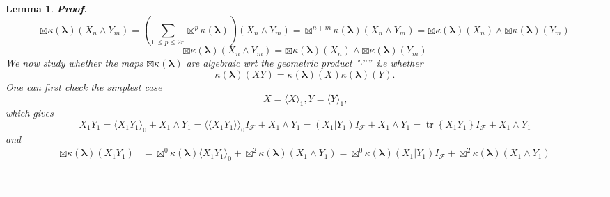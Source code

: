 \documentclass[aps, preprint]{revtex4}
\newtheorem{lemma}[theorem]{Lemma}
\newenvironment{proof}[1][Proof]{\noindent\textbf{#1.} }{\ \rule{0.5em}{0.5em}}
\begin{document}
\begin{lemma}
\begin{proof}
\begin{equation} \boxtimes \kappa  \left (\mathbf{\lambda }\right ) \left (X_{n} \wedge Y_{m}\right ) =\left (\sum _{0 \leq p \leq 2 r} \boxtimes ^{p}\kappa  \left (\mathbf{\lambda }\right )\right ) \left (X_{n} \wedge Y_{m}\right ) = \boxtimes ^{n +m}\kappa  \left (\mathbf{\lambda }\right ) \left (X_{n} \wedge Y_{m}\right ) = \boxtimes \kappa  \left (\mathbf{\lambda }\right ) \left (X_{n}\right )  \wedge  \boxtimes \kappa  \left (\mathbf{\lambda }\right ) \left (Y_{m}\right )
\end{equation}
\begin{equation} \boxtimes \kappa  \left (\mathbf{\lambda }\right ) \left (X_{n} \wedge Y_{m}\right ) = \boxtimes \kappa  \left (\mathbf{\lambda }\right ) \left (X_{n}\right )  \wedge  \boxtimes \kappa  \left (\mathbf{\lambda }\right ) \left (Y_{m}\right )
\end{equation}We now study whether the maps $ \boxtimes \kappa  \left (\mathbf{\lambda }\right )$ are algebraic wrt the geometric product "$ \cdot ""$ i.e whether
\begin{equation}\kappa  \left (\mathbf{\lambda }\right ) \left (X Y\right ) =\kappa  \left (\mathbf{\lambda }\right ) \left (X\right ) \kappa  \left (\mathbf{\lambda }\right ) \left (Y\right )\text{.}
\end{equation}One can first check the simplest case
\begin{equation}X = \langle X \rangle _{1} ,Y = \langle Y \rangle _{1}\text{,}
\end{equation}which gives
\begin{equation}X_{1} Y_{1} = \langle X_{1} Y_{1} \rangle _{0} +X_{1} \wedge Y_{1} = \langle  \langle X_{1} Y_{1} \rangle  \rangle _{0} I_{\mathcal{F}} +X_{1} \wedge Y_{1} =\left (\left .X_{1}\right \vert Y_{1}\right ) I_{\mathcal{F}} +X_{1} \wedge Y_{1} =\ensuremath{\operatorname*{tr}}\left \{X_{1} Y_{1}\right \} I_{\mathcal{F}} +X_{1} \wedge Y_{1}
\end{equation}and
\begin{align} \boxtimes \kappa  \left (\mathbf{\lambda }\right ) \left (X_{1} Y_{1}\right ) &  = \boxtimes ^{0}\kappa  \left (\mathbf{\lambda }\right )  \langle X_{1} Y_{1} \rangle _{0} + \boxtimes ^{2}\kappa  \left (\mathbf{\lambda }\right ) \left (X_{1} \wedge Y_{1}\right ) = \boxtimes ^{0}\kappa  \left (\mathbf{\lambda }\right ) \left (\left .X_{1}\right \vert Y_{1}\right ) I_{\mathcal{F}} + \boxtimes ^{2}\kappa  \left (\mathbf{\lambda }\right ) \left (X_{1} \wedge Y_{1}\right ) \\

\end{align}
\end{proof}
\end{lemma}
\end{document}
